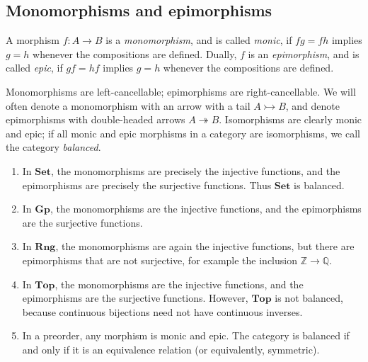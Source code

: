 \subsection{Monomorphisms and epimorphisms}
\begin{definition}
    A morphism \( f : A \to B \) is a \emph{monomorphism}, and is called \emph{monic}, if \( fg = fh \) implies \( g = h \) whenever the compositions are defined.
    Dually, \( f \) is an \emph{epimorphism}, and is called \emph{epic}, if \( gf = hf \) implies \( g = h \) whenever the compositions are defined.
\end{definition}
Monomorphisms are left-cancellable; epimorphisms are right-cancellable.
We will often denote a monomorphism with an arrow with a tail \( A \rightarrowtail B \), and denote epimorphisms with double-headed arrows \( A \twoheadrightarrow B \).
Isomorphisms are clearly monic and epic; if all monic and epic morphisms in a category are isomorphisms, we call the category \emph{balanced}.
\begin{example}
    \begin{enumerate}
        \item In \( \mathbf{Set} \), the monomorphisms are precisely the injective functions, and the epimorphisms are precisely the surjective functions.
        Thus \( \mathbf{Set} \) is balanced.
        \item In \( \mathbf{Gp} \), the monomorphisms are the injective functions, and the epimorphisms are the surjective functions.
        \item In \( \mathbf{Rng} \), the monomorphisms are again the injective functions, but there are epimorphisms that are not surjective, for example the inclusion \( \mathbb Z \to \mathbb Q \).
        \item In \( \mathbf{Top} \), the monomorphisms are the injective functions, and the epimorphisms are the surjective functions.
        However, \( \mathbf{Top} \) is not balanced, because continuous bijections need not have continuous inverses.
        \item In a preorder, any morphism is monic and epic.
        The category is balanced if and only if it is an equivalence relation (or equivalently, symmetric).
    \end{enumerate}
\end{example}
